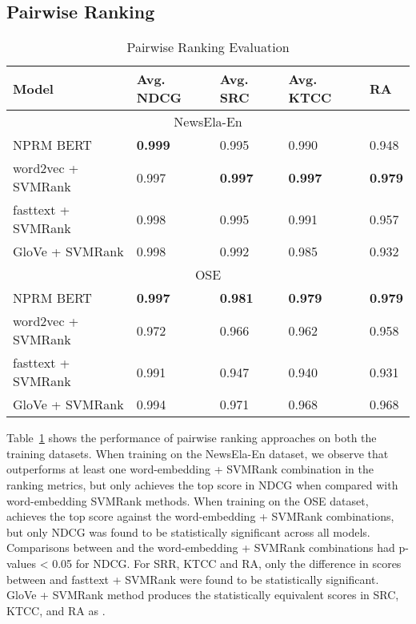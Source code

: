 \documentclass[11pt]{article}
\begin{document}
\subsection{Pairwise Ranking}

\begin{table}[htb]
\begin{tabular}{ |p{2.45cm}|p{0.85cm}|p{0.7cm}|p{0.8cm}| p{0.7cm}|}
 \hline
Model & Avg. NDCG & Avg. SRC & Avg. KTCC & RA\\
 \hline
\multicolumn{5}{|c|}{NewsEla-En} \\
\hline
NPRM BERT   & \textbf{0.999}    & 0.995 & 0.990 & 0.948\\
  \hline
word2vec + SVMRank & 0.997 & \textbf{0.997} & \textbf{0.997} & \textbf{0.979}\\
 \hline
fasttext + SVMRank & 0.998 & 0.995 & 0.991 & 0.957 \\
 \hline
GloVe + SVMRank  & 0.998 & 0.992 & 0.985 & 0.932 \\
 \hline 
 \multicolumn{5}{|c|}{OSE}\\
 \hline
NPRM BERT&  \textbf{0.997}  & \textbf{0.981} & \textbf{0.979} & \textbf{0.979}\\
 \hline
word2vec + SVMRank & 0.972 & 0.966 & 0.962 &0.958 \\
 \hline
fasttext + SVMRank & 0.991 & 0.947 & 0.940 & 0.931\\
 \hline
GloVe + SVMRank & 0.994 & 0.971 & 0.968 & 0.968\\
 \hline
\end{tabular}
\caption{Pairwise Ranking Evaluation}
\label{tab:rankingsingle}
\vspace{-4mm}
\end{table}
Table~\ref{tab:rankingsingle} shows the performance of pairwise ranking approaches on both the training datasets. When training on the NewsEla-En dataset, we observe that  outperforms at least one word-embedding + SVMRank combination in the ranking metrics, but only achieves the top score in NDCG when compared with word-embedding SVMRank methods. When training on the OSE dataset,  achieves the top score against the word-embedding + SVMRank combinations, but only NDCG was found to be statistically significant across all models.  Comparisons between  and the word-embedding + SVMRank combinations had p-values < 0.05 for NDCG.  For SRR, KTCC and RA, only the difference in scores between  and fasttext + SVMRank were found to be statistically significant. GloVe + SVMRank method produces the statistically equivalent scores in SRC, KTCC, and RA as . 
\end{document}
